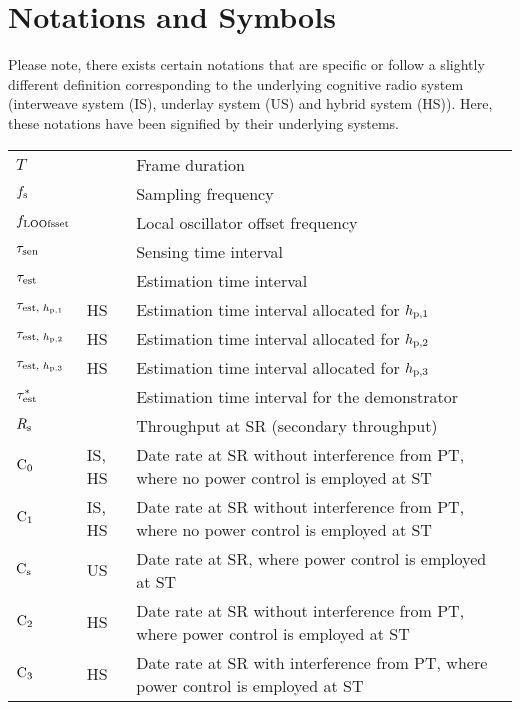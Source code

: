 
\chapter{Notations and Symbols}

Please note, there exists certain notations that are specific or follow a slightly different definition corresponding to the underlying cognitive radio system (interweave system (IS), underlay system (US) and hybrid system (HS)). Here, these notations have been signified by their underlying systems.  

\renewcommand{\arraystretch}{1.4}
\begin{longtable}{p{}p{}p{}}

       $T$                     & &             Frame duration \\
       $f_{\text{s}}$                 & &             Sampling frequency \\
       $f_{\text{LOOfsset}}$                  & & 	       Local oscillator offset frequency \\
       $\tau_{\text{sen}}$                 & &             Sensing time interval \\
       $\tau_{\text{est}}$                 & &             Estimation time interval \\      
       $\tau_{\text{est, $h_{\text{p,1}}$}}$                 & HS &             Estimation time interval allocated for $h_{\text{p,1}}$ \\      
       $\tau_{\text{est, $h_{\text{p,2}}$}}$                 & HS &             Estimation time interval allocated for $h_{\text{p,2}}$ \\      
       $\tau_{\text{est, $h_{\text{p,3}}$}}$                 & HS &             Estimation time interval allocated for $h_{\text{p,3}}$ \\      
       ${\tau}^*_{\text{est}}$               & &             Estimation time interval for the demonstrator \\      
       $R_{\text{s}}$                   & &             Throughput at SR (secondary throughput) \\
       $\text{C}_{\text{0}}$                   & IS, HS &      Date rate at SR without interference from PT, where no power control is employed at ST  \\
       $\text{C}_{\text{1}}$                   & IS, HS &      Date rate at SR without interference from PT, where no power control is employed at ST \\ 
       $\text{C}_{\text{s}}$                   & US &          Date rate at SR, where power control is employed at ST \\
       $\text{C}_{\text{2}}$                   & HS &      Date rate at SR without interference from PT, where power control is employed at ST  \\
       $\text{C}_{\text{3}}$                   & HS &      Date rate at SR with interference from PT, where power control is employed at ST  \\ 


\end{longtable}
